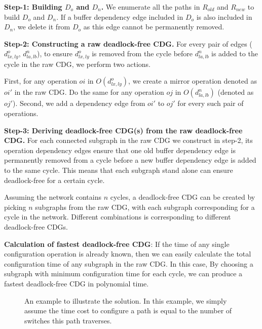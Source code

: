 \textbf{Step-1: Building $D_{o}$ and $D_{n}$.} We enumerate all the paths in $R_{old}$ and $R_{new}$ to build $D_{o}$ and $D_{n}$. If a buffer dependency edge included in $D_{o}$ is also included in $D_{n}$, we delete it from $D_{o}$ as this edge cannot be permanently removed.

\textbf{Step-2: Constructing a raw deadlock-free CDG.}  For every pair of edges ($d^{o}_{lx,ly}$,  $d^{n}_{la,lb}$), to ensure $d^{o}_{lx,ly}$ is removed from the cycle before  $d^{n}_{la,lb}$ is added to the cycle in the raw CDG, we perform two actions. 

First,  for any operation $oi$ in $O(d^{o}_{lx,ly})$, we create a mirror operation denoted as $oi'$ in the raw CDG. Do the same for any operation $oj$ in $O(d^{n}_{la,lb})$ (denoted as $oj'$).  Second, we add a dependency edge from $oi'$ to $oj'$ for every such pair of operations.

\textbf{Step-3: Deriving deadlock-free CDG(s) from the raw deadlock-free CDG.}  For each connected subgraph in the raw CDG we construct in step-2,  its operation dependency edges ensure that one old buffer dependency edge is permanently removed from a cycle before a new buffer dependency edge is added to the same cycle. This means that each subgraph stand alone can ensure deadlock-free for a certain cycle.  

Assuming the network contains $n$ cycles, a deadlock-free CDG can be created by picking $n$ subgraphs from the raw CDG,  with each subgraph corresponding for a cycle in the network. Different combinations is corresponding to different deadlock-free CDGs.

\textbf{Calculation of fastest deadlock-free CDG}: If the time of any single configuration operation is already known, then we can easily calculate the total configuration time of any subgraph in the raw CDG. In this case, By choosing a subgraph with minimum configuration time for each cycle, we can produce a fastest deadlock-free CDG in polynomial time.

\begin{figure}[t]
	\centering
	
	
	\caption{An example to illustrate the solution. In this example, we simply assume the time cost to configure a path is equal to the number of switches this path traverses.}\label{fig:solution_example}
	\vspace{-0.2in}
\end{figure}

